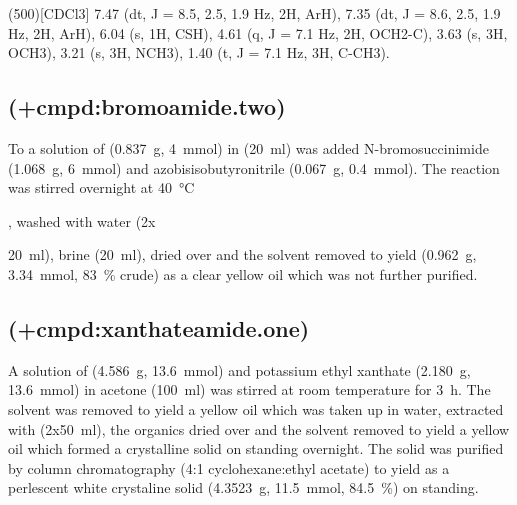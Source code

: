 {\NMR(500)[CDCl3] 7.47 (dt, J = 8.5, 2.5, 1.9 Hz, 2H, ArH), 7.35 (dt, J = 8.6, 2.5, 1.9 Hz, 2H, ArH), 6.04 (s, 1H, CSH), 4.61 (q, J = 7.1 Hz, 2H, OCH2-C), 3.63 (s, 3H, OCH3), 3.21 (s, 3H, NCH3), 1.40 (t, J = 7.1 Hz, 3H, C-CH3).





\subsection{ (\cmpd+{cmpd:bromoamide.two})}

To a solution of  (\SI{0.837}{\gram}, \SI{4}{\milli\mol}) in  (\SI{20}{\milli\litre}) was added N-bromosuccinimide (\SI{1.068}{\gram}, \SI{6}{\milli\mol}) and azobisisobutyronitrile (\SI{0.067}{\gram}, \SI{0.4}{\milli\mol}). The reaction was stirred overnight at \SI{40}{\celsius}}, washed with water (2x{\SI{20}{\milli\litre}), brine (\SI{20}{\milli\litre}), dried over  and the solvent removed \invacuo to yield  (\SI{0.962}{\gram}, \SI{3.34}{\milli\mol}, \SI{83}{\percent} crude) as a clear yellow oil which was not further purified.


\subsection{ (\cmpd+{cmpd:xanthateamide.one})}

A solution of  (\SI{4.586}{\gram}, \SI{13.6}{\milli\mol}) and potassium ethyl xanthate (\SI{2.180}{\gram}, \SI{13.6}{\milli\mol}) in acetone ({\SI{100}{\milli\litre}}) was stirred at room temperature for \SI{3}{\hour}. The solvent was removed \invacuo to yield a yellow oil which was taken up in water, extracted with  (2x\SI{50}{\milli\litre}), the organics dried over  and the solvent removed \invacuo to yield a yellow oil which formed a crystalline solid on standing overnight. The solid was purified by column chromatography (4:1 cyclohexane:ethyl acetate) to yield  as a perlescent white crystaline solid (\SI{4.3523}{\gram}, \SI{11.5}{\milli\mol}, \SI{84.5}{\percent}) on standing.

}
